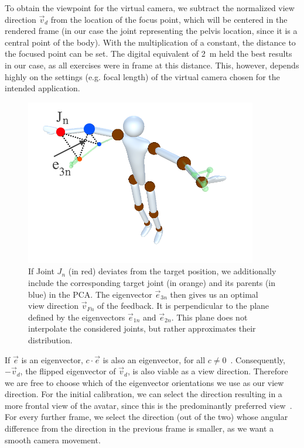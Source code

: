 To obtain the viewpoint for the virtual camera, we subtract the normalized view direction \(\vec{v}_d\) from the location of the focus point, which will be centered in the rendered frame (in our case the joint representing the pelvis location, since it is a central point of the body). With the multiplication of a constant, the distance to the focused point can be set. The digital equivalent of 2~m held the best results in our case, as all exercises were in frame at this distance. This, however, depends highly on the settings (e.g. focal length) of the virtual camera chosen for the intended application.

\begin{figure}[tb]
	\centering
	\includegraphics[width=\linewidth]{pictures/eigenvector.png}
	\caption{If Joint \(J_n\) (in red) deviates from the target position, we additionally include the corresponding target joint (in orange) and its parents (in blue) in the PCA. The eigenvector \(\vec{e}_{3n}\) then gives us an optimal view direction \(\vec{v}_{Fn}\) of the feedback. It is perpendicular to the plane defined by the eigenvectors \(\vec{e}_{1n}\) and \(\vec{e}_{2n}\). This plane does not interpolate the considered joints, but rather approximates their distribution.}
	\label{fig:eigenvector}
\end{figure}

If \(\vec{e}\) is an eigenvector, \(c \cdot \vec{e}\) is also an eigenvector, for all \(c \neq 0\)~\cite{borisenko}. Consequently, \(-\vec{v}_d\), the flipped eigenvector of \(\vec{v}_d\), is also viable as a view direction. Therefore we are free to choose which of the eigenvector orientations we use as our view direction. For the initial calibration, we can select the direction resulting in a more frontal view of the avatar, since this is the predominantly preferred view~\cite{zusne1970vpf}. For every further frame, we select the direction (out of the two) whose angular difference from the direction in the previous frame is smaller, as we want a smooth camera movement.

